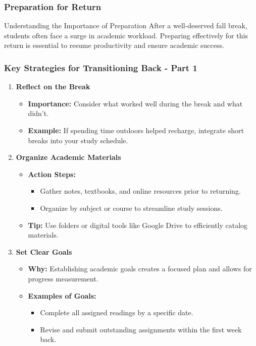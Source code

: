 \documentclass[aspectratio=169]{beamer}
\begin{document}
\begin{frame}[fragile]
    \frametitle{Preparation for Return}
    \begin{block}{Understanding the Importance of Preparation}
        After a well-deserved fall break, students often face a surge in academic workload. Preparing effectively for this return is essential to resume productivity and ensure academic success.
    \end{block}
\end{frame}

\begin{frame}[fragile]
    \frametitle{Key Strategies for Transitioning Back - Part 1}
    \begin{enumerate}
        \item \textbf{Reflect on the Break}
        \begin{itemize}
            \item \textbf{Importance:} Consider what worked well during the break and what didn’t.
            \item \textbf{Example:} If spending time outdoors helped recharge, integrate short breaks into your study schedule.
        \end{itemize}
        
        \item \textbf{Organize Academic Materials}
        \begin{itemize}
            \item \textbf{Action Steps:}
            \begin{itemize}
                \item Gather notes, textbooks, and online resources prior to returning.
                \item Organize by subject or course to streamline study sessions.
            \end{itemize}
            \item \textbf{Tip:} Use folders or digital tools like Google Drive to efficiently catalog materials.
        \end{itemize}
        
        \item \textbf{Set Clear Goals}
        \begin{itemize}
            \item \textbf{Why:} Establishing academic goals creates a focused plan and allows for progress measurement.
            \item \textbf{Examples of Goals:} 
            \begin{itemize}
                \item Complete all assigned readings by a specific date.
                \item Revise and submit outstanding assignments within the first week back.
            \end{itemize}
        \end{itemize}
    \end{enumerate}
\end{frame}
\end{document}
